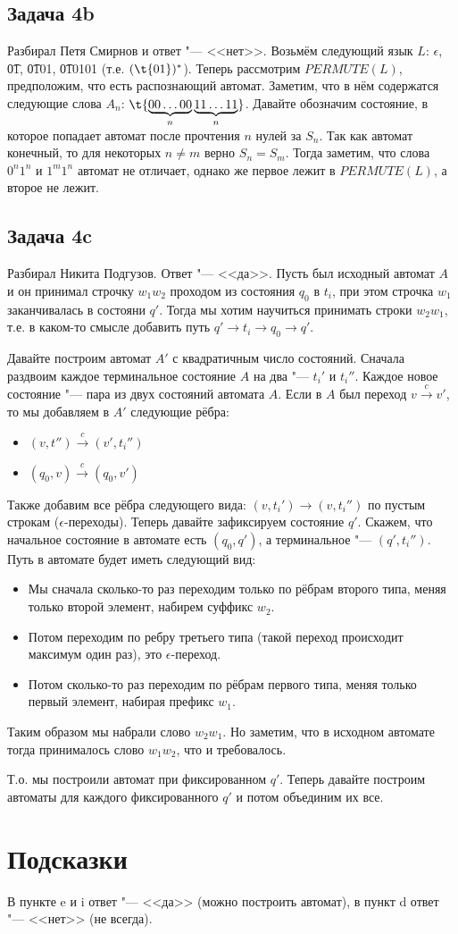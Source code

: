\subsection{Задача 4b}
	Разбирал Петя Смирнов и ответ "--- <<нет>>.
	Возьмём следующий язык $L$: $\epsilon$, \t{01}, \t{0101}, \t{010101} (т.е. $(\t{01})^*$).
	Теперь рассмотрим $PERMUTE(L)$, предположим, что есть распознающий автомат.
	Заметим, что в нём содержатся следующие слова $A_n$: $\t{\underbrace{00\dots00}_{n}\underbrace{11\dots11}_{n}}$.
	Давайте обозначим состояние, в которое попадает автомат после прочтения $n$ нулей за $S_n$.
	Так как автомат конечный, то для некоторых $n \neq m$ верно $S_n=S_m$.
	Тогда заметим, что слова $0^n1^n$ и $1^m1^n$ автомат не отличает, однако же первое лежит в $PERMUTE(L)$,
	а второе не лежит.

\subsection{Задача 4c}
	Разбирал Никита Подгузов.
	Ответ "--- <<да>>.
	Пусть был исходный автомат $A$ и он принимал строчку $w_1w_2$ проходом
	из состояния $q_0$ в $t_i$, при этом строчка $w_1$ заканчивалась в состояни $q'$.
	Тогда мы хотим научиться принимать строки $w_2w_1$, т.е. в каком-то смысле добавить
	путь $q' \to t_i \to q_0 \to q'$.

	Давайте построим автомат $A'$ с квадратичным число состояний.
	Сначала раздвоим каждое терминальное состояние $A$ на два "--- $t_i'$ и $t_i''$.
	Каждое новое состояние "--- пара из двух состояний автомата $A$.
	Если в $A$ был переход $v \xrightarrow{c} v'$, то мы добавляем в $A'$ следующие рёбра:
	\begin{itemize}
		\item $(v, t'') \xrightarrow{c} (v', t_i'')$
		\item $(q_0, v) \xrightarrow{c} (q_0, v')$
	\end{itemize}
	Также добавим все рёбра следующего вида: $(v, t_i') \to (v, t_i'')$ по пустым строкам ($\epsilon$-переходы).
	Теперь давайте зафиксируем состояние $q'$.
	Скажем, что начальное состояние в автомате есть $(q_0, q')$, а терминальное "--- $(q', t_i'')$.
	Путь в автомате будет иметь следующий вид:
	\begin{itemize}
		\item
			Мы сначала сколько-то раз переходим только по рёбрам второго типа, меняя только второй элемент, набирем суффикс $w_2$.
		\item
			Потом переходим по ребру третьего типа (такой переход происходит максимум один раз), это $\epsilon$-переход.
		\item
			Потом сколько-то раз переходим по рёбрам первого типа, меняя только первый элемент, набирая префикс $w_1$.
	\end{itemize}
	Таким образом мы набрали слово $w_2w_1$.
	Но заметим, что в исходном автомате тогда принималось слово $w_1w_2$, что и требовалось.

	Т.о. мы построили автомат при фиксированном $q'$.
	Теперь давайте построим автоматы для каждого фиксированного $q'$ и потом объединим их все.

\section{Подсказки}
	В пункте e и i ответ "--- <<да>> (можно построить автомат), в пункт d ответ "--- <<нет>> (не всегда).
